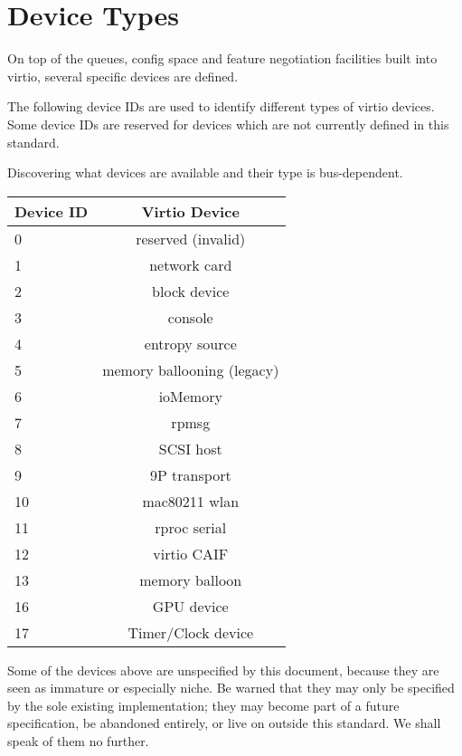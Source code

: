 \chapter{Device Types}\label{sec:Device Types}

On top of the queues, config space and feature negotiation facilities
built into virtio, several specific devices are defined.

The following device IDs are used to identify different types of virtio
devices.  Some device IDs are reserved for devices which are not currently
defined in this standard.

Discovering what devices are available and their type is bus-dependent.

\begin{tabular} { |l|c| }
\hline
Device ID  &  Virtio Device    \\
\hline \hline
0          & reserved (invalid) \\
\hline
1          &   network card     \\
\hline
2          &   block device     \\
\hline
3          &      console       \\
\hline
4          &  entropy source    \\
\hline
5          & memory ballooning (legacy)  \\
\hline
6          &     ioMemory       \\
\hline
7          &       rpmsg        \\
\hline
8          &     SCSI host      \\
\hline
9          &   9P transport     \\
\hline
10         &   mac80211 wlan    \\
\hline
11         &   rproc serial     \\
\hline
12         &   virtio CAIF      \\
\hline
13         &  memory balloon    \\
\hline
16         &   GPU device       \\
\hline
17         &   Timer/Clock device \\
\hline
\end{tabular}

Some of the devices above are unspecified by this document,
because they are seen as immature or especially niche.  Be warned
that they may only be specified by the sole existing implementation;
they may become part of a future specification, be abandoned
entirely, or live on outside this standard.  We shall speak of
them no further.

